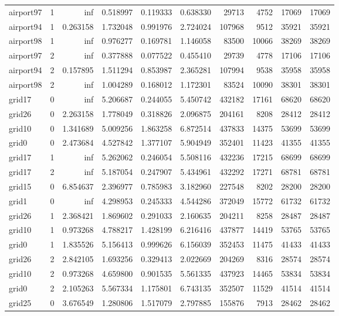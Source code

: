 \begin{longtable}{|l|r|r|r|r|r|r|r|r|r|}
airport97 & 1 & inf & 0.518997 & 0.119333 & 0.638330 & 29713 & 4752 & 17069 & 17069 \\
airport94 & 1 & 0.263158 & 1.732048 & 0.991976 & 2.724024 & 107968 & 9512 & 35921 & 35921 \\
airport98 & 1 & inf & 0.976277 & 0.169781 & 1.146058 & 83500 & 10066 & 38269 & 38269 \\
airport97 & 2 & inf & 0.377888 & 0.077522 & 0.455410 & 29739 & 4778 & 17106 & 17106 \\
airport94 & 2 & 0.157895 & 1.511294 & 0.853987 & 2.365281 & 107994 & 9538 & 35958 & 35958 \\
airport98 & 2 & inf & 1.004289 & 0.168012 & 1.172301 & 83524 & 10090 & 38301 & 38301 \\
grid17 & 0 & inf & 5.206687 & 0.244055 & 5.450742 & 432182 & 17161 & 68620 & 68620 \\
grid26 & 0 & 2.263158 & 1.778049 & 0.318826 & 2.096875 & 204161 & 8208 & 28412 & 28412 \\
grid10 & 0 & 1.341689 & 5.009256 & 1.863258 & 6.872514 & 437833 & 14375 & 53699 & 53699 \\
grid0 & 0 & 2.473684 & 4.527842 & 1.377107 & 5.904949 & 352401 & 11423 & 41355 & 41355 \\
grid17 & 1 & inf & 5.262062 & 0.246054 & 5.508116 & 432236 & 17215 & 68699 & 68699 \\
grid17 & 2 & inf & 5.187054 & 0.247907 & 5.434961 & 432292 & 17271 & 68781 & 68781 \\
grid15 & 0 & 6.854637 & 2.396977 & 0.785983 & 3.182960 & 227548 & 8202 & 28200 & 28200 \\
grid1 & 0 & inf & 4.298953 & 0.245333 & 4.544286 & 372049 & 15772 & 61732 & 61732 \\
grid26 & 1 & 2.368421 & 1.869602 & 0.291033 & 2.160635 & 204211 & 8258 & 28487 & 28487 \\
grid10 & 1 & 0.973268 & 4.788217 & 1.428199 & 6.216416 & 437877 & 14419 & 53765 & 53765 \\
grid0 & 1 & 1.835526 & 5.156413 & 0.999626 & 6.156039 & 352453 & 11475 & 41433 & 41433 \\
grid26 & 2 & 2.842105 & 1.693256 & 0.329413 & 2.022669 & 204269 & 8316 & 28574 & 28574 \\
grid10 & 2 & 0.973268 & 4.659800 & 0.901535 & 5.561335 & 437923 & 14465 & 53834 & 53834 \\
grid0 & 2 & 2.105263 & 5.567334 & 1.175801 & 6.743135 & 352507 & 11529 & 41514 & 41514 \\
grid25 & 0 & 3.676549 & 1.280806 & 1.517079 & 2.797885 & 155876 & 7913 & 28462 & 28462 \\

\end{longtable}
